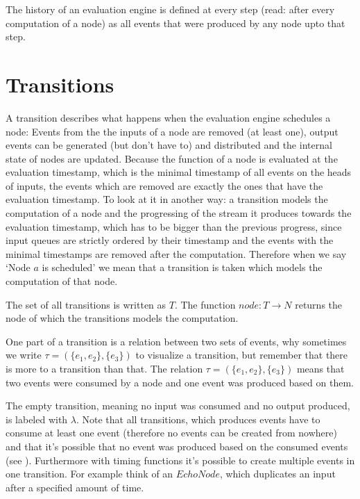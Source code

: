 The history of an evaluation engine is defined at every step (read: after every computation of a node) as all events that were produced by any node upto that step.

\section{Transitions}
\label{sec:definitions:transitions}

A transition describes what happens when the evaluation engine schedules a node:
Events from the the inputs of a node are removed (at least one), output events can be generated (but don't have to) and distributed and the internal state of nodes are updated.
Because the function of a node is evaluated at the evaluation timestamp, which is the minimal timestamp of all events on the heads of inputs, the events which are removed are exactly the ones that have the evaluation timestamp.
To look at it in another way: a transition models the computation of a node and the progressing of the stream it produces towards the evaluation timestamp, which has to be bigger than the previous progress, since input queues are strictly ordered by their timestamp and the events with the minimal timestamps are removed after the computation.
Therefore when we say `Node \(a\) is scheduled' we mean that a transition is taken which models the computation of that node.

The set of all transitions is written as \(T\).
The function \(\mathit{node} : T \rightarrow N\) returns the node of which the transitions models the computation.

One part of a transition is a relation between two sets of events, why sometimes we write \(\tau = (\{e_1, e_2\}, \{e_3\})\) to visualize a transition, but remember that there is more to a transition than that.
The relation \(\tau = (\{e_1,e_2\}, \{e_3\})\) means that two events were consumed by a node and one event was produced based on them.

The empty transition, meaning no input was consumed and no output produced, is labeled with \(\lambda\).
Note that all transitions, which produces events have to consume at least one event (therefore no events can be created from nowhere) and that it's possible that no event was produced based on the consumed events (see ).
Furthermore with timing functions it's possible to create multiple events in one transition.
For example think of an \(\mathit{EchoNode}\), which duplicates an input after a specified amount of time.

